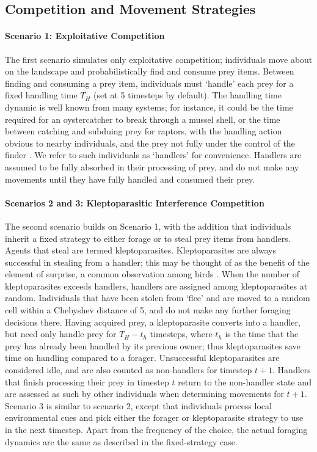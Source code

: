 \documentclass[11pt]{article}
\begin{document}
\subsection{Competition and Movement Strategies}

\paragraph{Scenario 1: Exploitative Competition}

The first scenario simulates only exploitative competition; individuals move about on the landscape and probabilistically find and consume prey items.
Between finding and consuming a prey item, individuals must `handle' each prey for a fixed handling time $T_H$ (set at 5 timesteps by default).
The handling time dynamic is well known from many systems; for instance, it could be the time required for an oystercatcher to break through a mussel shell,
or the time between catching and subduing prey for raptors, with the handling action obvious to nearby individuals, and the prey not fully under the control of the finder \citep{brockmann1979}.
We refer to such individuals as `handlers' for convenience.
Handlers are assumed to be fully absorbed in their processing of prey, and do not make any movements until they have fully handled and consumed their prey.

\paragraph{Scenarios 2 and 3: Kleptoparasitic Interference Competition}

The second scenario builds on Scenario 1, with the addition that individuals inherit a fixed strategy to either forage or to steal prey items from handlers.
Agents that steal are termed kleptoparasites.
Kleptoparasites are always successful in stealing from a handler; this may be thought of as the benefit of the element of surprise, a common observation among birds \cite{brockmann1979}.
When the number of kleptoparasites exceeds handlers, handlers are assigned among kleptoparasites at random.
Individuals that have been stolen from `flee' and are moved to a random cell within a Chebyshev distance of 5, and do not make any further foraging decisions there.
Having acquired prey, a kleptoparasite converts into a handler, but need only handle prey for $T_H - t_h$ timesteps, where $t_h$ is the time that the prey has already been handled by its previous owner; thus kleptoparasites save time on handling compared to a forager.
Unsuccessful kleptoparasites are considered idle, and are also counted as non-handlers for timestep $t+1$.
Handlers that finish processing their prey in timestep $t$ return to the non-handler state and are assessed as such by other individuals when determining movements for $t+1$.
Scenario 3 is similar to scenario 2, except that individuals process local environmental cues and pick either the forager or kleptoparasite strategy to use in the next timestep.
Apart from the frequency of the choice, the actual foraging dynamics are the same as described in the fixed-strategy case.
\end{document}
